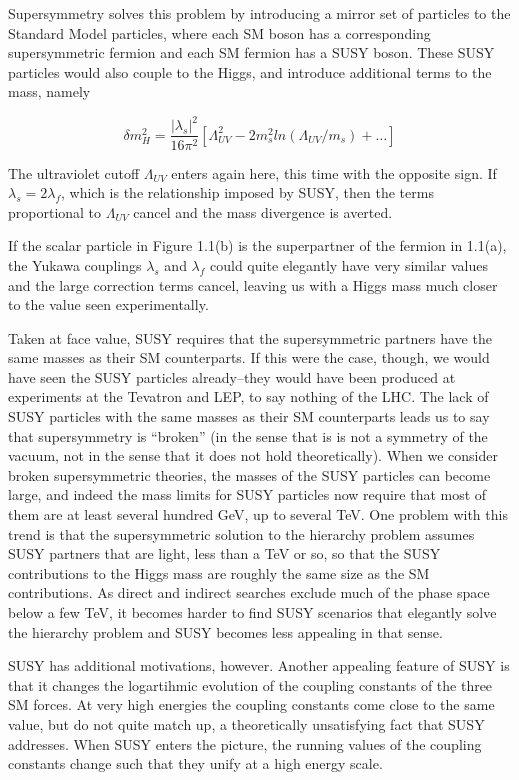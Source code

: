 Supersymmetry solves this problem by introducing a mirror set of particles to the Standard Model 
particles, where each SM boson has a corresponding supersymmetric fermion and each SM fermion 
has a SUSY boson.  These SUSY particles would also couple to the Higgs, 
and introduce additional terms to the mass, namely

\begin{equation}
	\delta m_H^2 = \frac{|\lambda_s |^2}{16\pi^2}[\Lambda_{UV}^2-2m_s^2ln(\Lambda_{UV}/m_s)+\ldots]
\end{equation}

The ultraviolet cutoff $\Lambda_{UV}$ enters again here, this time with 
the opposite sign.  If $\lambda_s = 2\lambda_f$, which is the relationship 
imposed by SUSY, then the terms proportional to $\Lambda_{UV}$ cancel and the
mass divergence is averted.

If the scalar particle in Figure 1.1(b) is the superpartner of the fermion in 1.1(a),
the Yukawa couplings $\lambda_s$ and $\lambda_f$ could quite elegantly have very 
similar values and the large correction terms cancel, leaving us with a Higgs mass
much closer to the value seen experimentally. 

Taken at face value, SUSY requires that the supersymmetric partners have the same masses 
as their SM counterparts.  If this were the case, though, we would 
have seen the SUSY particles already--they would have been produced at experiments
at the Tevatron and LEP, to say nothing of the LHC.
The lack of SUSY particles with the same masses as their SM counterparts 
leads us to say that supersymmetry is ``broken'' (in the sense 
that is is not a symmetry of the vacuum, not in the sense that 
it does not hold theoretically).  When we consider broken supersymmetric theories, the 
masses of the SUSY particles can become large, and indeed the mass limits for 
SUSY particles now require that most of them are at least several hundred GeV, up 
to several TeV.  One problem with this trend is that the supersymmetric solution to 
the hierarchy problem assumes SUSY partners that are light, less than a TeV or 
so, so that the SUSY contributions to the Higgs mass are roughly the same 
size as the SM contributions.  As direct and indirect searches exclude much of the 
phase space below a few TeV, it becomes harder to find SUSY scenarios that 
elegantly solve the hierarchy problem and SUSY becomes less appealing in that sense. 

SUSY has additional motivations, however.  Another appealing feature of SUSY is that it 
changes the logartihmic evolution of the coupling constants of the three SM forces.  At very high energies the 
coupling constants come close to the same value, but do not quite match up, 
a theoretically unsatisfying fact that SUSY addresses.  When SUSY enters the picture, the 
running values of the coupling constants change such that they unify at a high energy scale.

